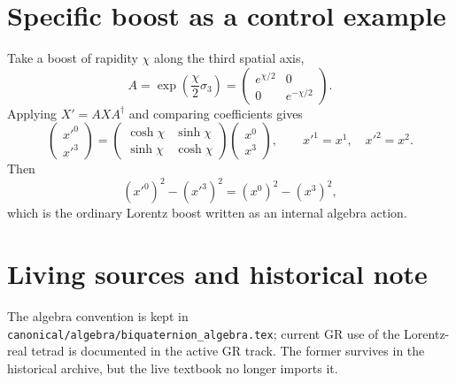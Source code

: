 \section{Specific boost as a control example}
Take a boost of rapidity $\chi$ along the third spatial axis,
\[
 A=\exp\left(\frac{\chi}{2}\sigma_3\right)
 =\begin{pmatrix}e^{\chi/2}&0\\0&e^{-\chi/2}\end{pmatrix}.
\]
Applying $X'=AXA^\dagger$ and comparing coefficients gives
\[
 \begin{pmatrix}x'^0\\x'^3\end{pmatrix}
 =\begin{pmatrix}\cosh\chi&\sinh\chi\\
                  \sinh\chi&\cosh\chi\end{pmatrix}
  \begin{pmatrix}x^0\\x^3\end{pmatrix},
 \qquad x'^1=x^1,\quad x'^2=x^2.
\]
Then
\[
 (x'^0)^2-(x'^3)^2=(x^0)^2-(x^3)^2,
\]
which is the ordinary Lorentz boost written as an internal algebra action.

\section{Living sources and historical note}
The algebra convention is kept in
\texttt{canonical/algebra/biquaternion\_algebra.tex}; current GR use of the
Lorentz-real tetrad is documented in the active GR track.  The former
 survives in the historical archive,
but the live textbook no longer imports it.
